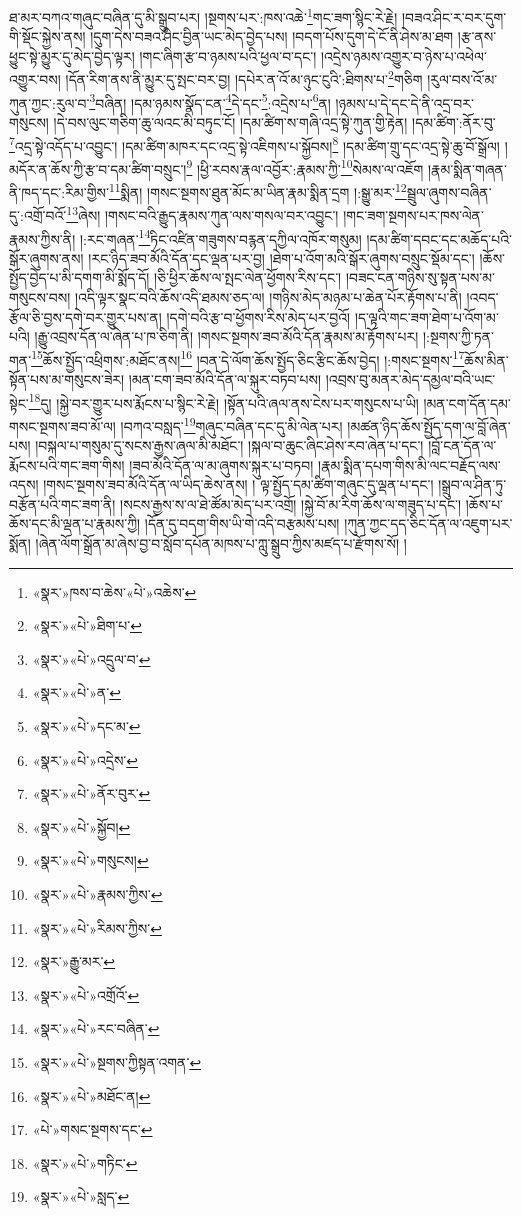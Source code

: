 ཐ་མར་བཀའ་གཞུང་བཞིན་དུ་མི་སྒྲུབ་པར། །སྔགས་པར་:ཁས་འཆེ་\footnote{«སྣར་»ཁས་བ་ཆེས་«པེ་»འཆེས་}གང་ཟག་སྙིང་རེ་རྗེ། །བཟའ་ཤིང་ར་བར་དུག་གི་སྡོང་སྐྱེས་ནས། །དུག་དེས་བཟའ་ཤིང་བྱིན་ཡང་མེད་བྱེད་པས། །བདག་པོས་དུག་དེ་ངོ་ནི་ཤེས་མ་ཐག །རྩ་ནས་ཕྱུང་སྟེ་མྱུར་དུ་མེད་བྱེད་ལྟར། །གང་ཞིག་རྩ་བ་ཉམས་པའི་ཕྱལ་བ་དང་། །འདྲེས་ཉམས་འགྱུར་བ་ཉེས་པ་འཕེལ་འགྱུར་བས། །དོན་རིག་ནས་ནི་མྱུར་དུ་སྤང་བར་བྱ། །དཔེར་ན་འོ་མ་ཉུང་ངུའི་:ཐིགས་པ་\footnote{«སྣར་»«པེ་»ཐིག་པ་}གཅིག །རུལ་བས་འོ་མ་ཀུན་ཀྱང་:རུལ་བ་\footnote{«སྣར་»«པེ་»འདྲུལ་བ་}བཞིན། །དམ་ཉམས་སྣོད་ངན་\footnote{«སྣར་»«པེ་»ན་}དེ་དང་\footnote{«སྣར་»«པེ་»དང་མ་}:འདྲེས་པ་\footnote{«སྣར་»«པེ་»འདྲེས་}ན། །ཉམས་པ་དེ་དང་དེ་ནི་འདྲ་བར་གསུངས། །དེ་བས་ལུང་གཅིག་ཆུ་ལའང་མི་བཏུང་ངོ། །དམ་ཚིག་ས་གཞི་འདྲ་སྟེ་ཀུན་གྱི་རྟེན། །དམ་ཚིག་:ནོར་བུ་\footnote{«སྣར་»«པེ་»ནོར་བུར་}འདྲ་སྟེ་འདོད་པ་འབྱུང་། །དམ་ཚིག་མཁར་དང་འདྲ་སྟེ་འཇིགས་པ་སྐྱོབས།\footnote{«སྣར་»«པེ་»སྐྱོབ།} །དམ་ཚིག་གྲུ་དང་འདྲ་སྟེ་ཆུ་བོ་སྒྲོལ། །མདོར་ན་ཆོས་ཀྱི་རྩ་བ་དམ་ཚིག་བསྲུང་།\footnote{«སྣར་»«པེ་»གསུངས།} །ཕྱི་རབས་རྣལ་འབྱོར་:རྣམས་ཀྱི་\footnote{«སྣར་»«པེ་»རྣམས་ཀྱིས་}སེམས་ལ་འཇོག །རྣམ་སྨིན་གཞན་ནི་ཁད་དང་:རིམ་གྱིས་\footnote{«སྣར་»«པེ་»རིམས་ཀྱིས་}སྨིན། །གསང་སྔགས་ཐུན་མོང་མ་ཡིན་རྣམ་སྨིན་དྲག །:སྒྱུ་མར་\footnote{«སྣར་»རྒྱུ་མར་}སྦྲུལ་ཞུགས་བཞིན་དུ་:འགྲོ་བའོ་\footnote{«སྣར་»«པེ་»འགྲོའོ་}ཞེས། །གསང་བའི་རྒྱུད་རྣམས་ཀུན་ལས་གསལ་བར་འབྱུང་། །གང་ཟག་སྔགས་པར་ཁས་ལེན་རྣམས་ཀྱིས་ནི། །:རང་གཞན་\footnote{«སྣར་»«པེ་»རང་བཞིན་}ཏིང་འཛིན་གཟུགས་བརྙན་དཀྱིལ་འཁོར་གསུམ། །དམ་ཚིག་དབང་དང་མཆོད་པའི་སྒོར་ཞུགས་ནས། །རང་ཉིད་ཟབ་མོའི་དོན་དང་ལྡན་པར་བྱ། །ཐེག་པ་འོག་མའི་སྒོར་ཞུགས་བསྲུང་སྡོམ་དང་། །ཆོས་སྤྱོད་བྱེད་པ་མི་དགག་མི་སྨོད་དོ། །ཅི་ཕྱིར་ཆོས་ལ་སྤང་ལེན་ཕྱོགས་རིས་དང་། །བཟང་ངན་གཉིས་སུ་སྟན་པས་མ་གསུངས་བས། །འདི་ལྟར་སྣང་བའི་ཆོས་འདི་ཐམས་ཅད་ལ། །གཉིས་མེད་མཉམ་པ་ཆེན་པོར་རྟོགས་པ་ནི། །འབད་རྩོལ་ཅི་བྱས་དགེ་བར་གྱུར་པས་ན། །དགེ་བའི་རྩ་བ་ཕྱོགས་རིས་མེད་པར་བྱའོ། །ད་ལྟའི་གང་ཟག་ཐེག་པ་འོག་མ་པའི། །རྒྱུ་འབྲས་དོན་ལ་ཞེན་པ་ཁ་ཅིག་ནི། །གསང་སྔགས་ཟབ་མོའི་དོན་རྣམས་མ་རྟོགས་པར། །:སྔགས་ཀྱི་ཏན་གན་\footnote{«སྣར་»«པེ་»སྔགས་ཀྱིསྟན་འགན་}ཆོས་སྤྱོད་འཕྲིགས་:མཐོང་ནས།\footnote{«སྣར་»«པེ་»མཐོང་ན།} །བན་དེ་ལོག་ཆོས་སྤྱོད་ཅིང་རྩིང་ཆོས་བྱེད། །:གསང་སྔགས་\footnote{«པེ་»གསང་སྔགས་དང་}ཆོས་མིན་སྟོན་པས་མ་གསུངས་ཟེར། །མན་ངག་ཟབ་མོའི་དོན་ལ་སྐུར་བཏབ་པས། །འབྲས་བུ་མནར་མེད་དམྱལ་བའི་ཡང་སྟེང་\footnote{«སྣར་»«པེ་»གཏིང་}དུ། །སྐྱེ་བར་གྱུར་པས་རྨོངས་པ་སྙིང་རེ་རྗེ། །སྟོན་པའི་ཞལ་ནས་ངེས་པར་གསུངས་པ་ཡི། །མན་ངག་དོན་དམ་གསང་སྔགས་ཟབ་མོ་ལ། །བཀའ་བསླད་\footnote{«སྣར་»«པེ་»སླད་}གཞུང་བཞིན་དང་དུ་མི་ལེན་པར། །མཚན་ཉིད་ཆོས་སྤྱོད་དག་ལ་བློ་ཞེན་པས། །བསྐལ་པ་གསུམ་དུ་སངས་རྒྱས་ཞལ་མི་མཐོང་། །སྐལ་བ་ཆུང་ཞིང་ཤེས་རབ་ཞེན་པ་དང་། །བློ་ངན་དོན་ལ་རྨོངས་པའི་གང་ཟག་གིས། །ཟབ་མོའི་དོན་ལ་མ་ཞུགས་སྐུར་པ་བཏབ། །རྣམ་སྨིན་དཔག་གིས་མི་ལང་བརྗོད་ལས་འདས། །གསང་སྔགས་ཟབ་མོའི་དོན་ལ་ཡིད་ཆེས་ནས། །
ལྟ་སྤྱོད་དམ་ཚིག་གཞུང་དུ་ལྡན་པ་དང་། །སྒྲུབ་ལ་ཤིན་ཏུ་བརྩོན་པའི་གང་ཟག་ནི། །སངས་རྒྱས་ས་ལ་ཐེ་ཚོམ་མེད་པར་འགྲོ། །སྐྱེ་བོ་མ་རིག་ཆོས་ལ་གཟུད་པ་དང་། །ཆོས་པ་ཆོས་དང་མི་ལྡན་པ་རྣམས་ཀྱི། །དོན་དུ་བདག་གིས་ཡི་གེ་འདི་བརྩམས་པས། །ཀུན་ཀྱང་དད་ཅིང་དོན་ལ་འཇུག་པར་སྨོན། །ཞེན་ལོག་སྒྲོན་མ་ཞེས་བྱ་བ་སློབ་དཔོན་མཁས་པ་ཀླུ་སྒྲུབ་ཀྱིས་མཛད་པ་རྫོགས་སོ། ། 